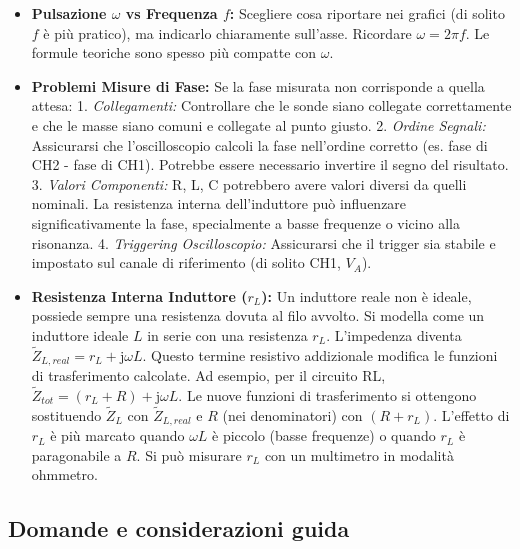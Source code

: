 \documentclass[a4paper, 11pt]{article}
\newcommand{\jj}{\mathrm{j}} %
\begin{document}
\begin{itemize}
    \item \textbf{Pulsazione $\omega$ vs Frequenza $f$:} Scegliere cosa riportare nei grafici (di solito $f$ è più pratico), ma indicarlo chiaramente sull'asse. Ricordare $\omega = 2\pi f$. Le formule teoriche sono spesso più compatte con $\omega$.
    \item \textbf{Problemi Misure di Fase:} Se la fase misurata non corrisponde a quella attesa:
        1. \textit{Collegamenti:} Controllare che le sonde siano collegate correttamente e che le masse siano comuni e collegate al punto giusto.
        2. \textit{Ordine Segnali:} Assicurarsi che l'oscilloscopio calcoli la fase nell'ordine corretto (es. fase di CH2 - fase di CH1). Potrebbe essere necessario invertire il segno del risultato.
        3. \textit{Valori Componenti:} R, L, C potrebbero avere valori diversi da quelli nominali. La resistenza interna dell'induttore può influenzare significativamente la fase, specialmente a basse frequenze o vicino alla risonanza.
        4. \textit{Triggering Oscilloscopio:} Assicurarsi che il trigger sia stabile e impostato sul canale di riferimento (di solito CH1, $V_A$).
    \item \textbf{Resistenza Interna Induttore ($r_L$):} Un induttore reale non è ideale, possiede sempre una resistenza dovuta al filo avvolto. Si modella come un induttore ideale $L$ in serie con una resistenza $r_L$. L'impedenza diventa $\tilde{Z}_{L,real} = r_L + \jj \omega L$. Questo termine resistivo addizionale modifica le funzioni di trasferimento calcolate. Ad esempio, per il circuito RL, $\tilde{Z}_{tot} = (r_L + R) + \jj \omega L$. Le nuove funzioni di trasferimento si ottengono sostituendo $\tilde{Z}_L$ con $\tilde{Z}_{L,real}$ e $R$ (nei denominatori) con $(R+r_L)$. L'effetto di $r_L$ è più marcato quando $\omega L$ è piccolo (basse frequenze) o quando $r_L$ è paragonabile a $R$. Si può misurare $r_L$ con un multimetro in modalità ohmmetro.
\end{itemize}

\subsection{Domande e considerazioni guida}
\end{document}
